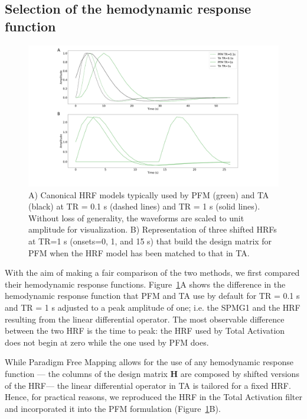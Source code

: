 \subsection{Selection of the hemodynamic response function}

\begin{figure}[h]
    \includegraphics[width=\columnwidth]{figures/pfm_ta_hrf.pdf}
    \caption{A) Canonical HRF models typically used by PFM (green) and TA (black) at TR = 0.1 s (dashed lines) and TR = 1 s (solid lines). Without loss of generality, the waveforms are scaled to unit amplitude for visualization. B) Representation of three shifted HRFs at TR=1 s (onsets=0, 1, and 15 s) that build the design matrix for PFM when the HRF model has been matched to that in TA.}
\label{fig:hrf_diff}
\end{figure}

With the aim of making a fair comparison of the two methods, we first compared their hemodynamic response functions. Figure~\ref{fig:hrf_diff}A shows the difference in the hemodynamic response function that PFM and TA use by default for TR = 0.1 s and TR = 1 s adjusted to a peak amplitude of one; i.e. the SPMG1 and the HRF resulting from the linear differential operator. The most observable difference between the two HRF is the time to peak: the HRF used by Total Activation does not begin at zero while the one used by PFM does.

While Paradigm Free Mapping allows for the use of any hemodynamic response function --- the columns of the design matrix \(\mathbf{H}\) are composed by shifted versions of the HRF--- the linear differential operator in TA is tailored for a fixed HRF. Hence, for practical reasons, we reproduced the HRF in the Total Activation filter and incorporated it into the PFM formulation (Figure~\ref{fig:hrf_diff}B).

